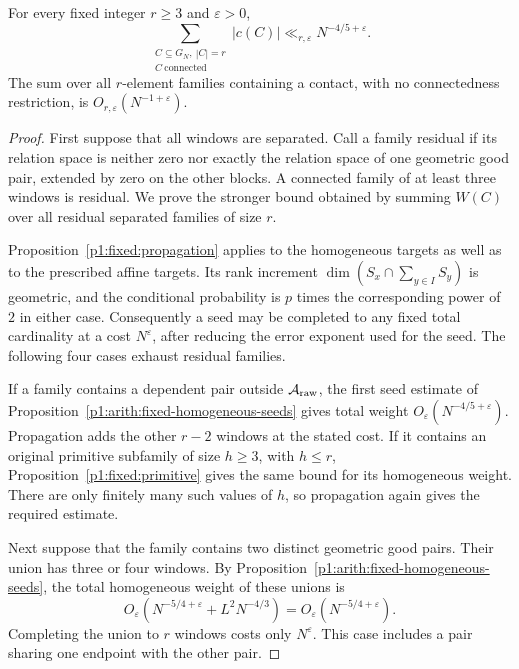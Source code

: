 \begin{lemma}
\label{p1:core:fixed-centred}
For every fixed integer $r\ge3$ and $\varepsilon>0$,
\begin{equation}
 \sum_{\substack{C\subseteq G_N,\ |C|=r\\C\ \mathrm{connected}}}
       |c(C)|\ll_{r,\varepsilon}N^{-4/5+\varepsilon}.
 \label{p1:core:fixed-centred-bound}
\end{equation}
The sum over all $r$-element families containing a contact, with no
connectedness restriction, is $O_{r,\varepsilon}(N^{-1+\varepsilon})$.
\end{lemma}
\begin{proof}
First suppose that all windows are separated. Call a family residual if
its relation space is neither zero nor exactly the relation space of one
geometric good pair, extended by zero on the other blocks. A connected
family of at least three windows is residual. We prove the stronger bound
obtained by summing $W(C)$ over all residual separated families of size $r$.

Proposition~\ref{p1:fixed:propagation} applies to the homogeneous targets
as well as to the prescribed affine targets. Its rank increment
$\dim(S_x\cap\sum_{y\in I}S_y)$ is geometric, and the conditional
probability is $p$ times the corresponding power of $2$ in either case.
Consequently a seed may be completed to any fixed total cardinality at
a cost $N^{\varepsilon}$, after reducing the error exponent used for
the seed. The following four cases exhaust residual families.

If a family contains a dependent pair outside $\mathcal A_{\rm raw}$,
the first seed estimate of Proposition~\ref{p1:arith:fixed-homogeneous-seeds}
gives total weight $O_\varepsilon(N^{-4/5+\varepsilon})$. Propagation
adds the other $r-2$ windows at the stated cost. If it contains an
original primitive subfamily of size $h\ge3$, with $h\le r$,
Proposition~\ref{p1:fixed:primitive} gives the same bound for its
homogeneous weight. There are only finitely many such values of $h$,
so propagation again gives the required estimate.

Next suppose that the family contains two distinct geometric good pairs.
Their union has three or four windows. By
Proposition~\ref{p1:arith:fixed-homogeneous-seeds}, the total homogeneous
weight of these unions is
\[
 O_\varepsilon(N^{-5/4+\varepsilon}+L^2N^{-4/3})
       =O_\varepsilon(N^{-5/4+\varepsilon}).
\]
Completing the union to $r$ windows costs only $N^{\varepsilon}$.
This case includes a pair sharing one endpoint with the other pair.


\end{proof}
